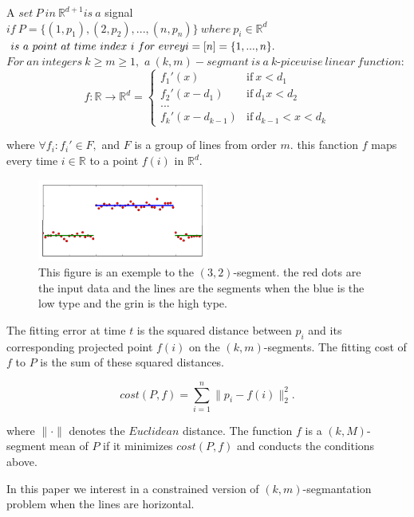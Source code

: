 \documentclass{vldb}
\begin{document}
\begin{definition}
A $set\ P\ in\ \mathbb{R}^{d+1} is\ a$ signal\\ 
$if\ P = \lbrace(1, p_1),(2, p_2),...,(n, p_n)\rbrace\ where\ p_i\in\mathbb{R}^d$ 
$is\ a\ point\ at\ time\ index\ i\ for\ evrey\\
i=[n]=\lbrace1,...,n\rbrace.$
$For\ an\ integers\ k\geq m\geq1,$
$a\ (k,m)-segmant\ is\ a\ k$-$picewise\ linear\ function:$
\[
f:\mathbb{R}\rightarrow\mathbb{R}^d = 
\begin{cases}
  \phantom{}f_1'(x) & \text{if}\ x<d_1 \\
  f_2'(x-d_1)        & \text{if}\ d_1x<d_2\\
  ...\\
  f_k'(x-d_{k-1})    & \text{if}\ d_{k-1}<x<d_k
\end{cases}
\]


where $\forall f_i : f_i' \in F,$ and $F$ is a group of lines from order $m$.
this fanction $f$ maps every time $i\in \mathbb{R}$ to a point $f(i)$ in $\mathbb{R}^d$.
\begin{figure}[H]

    \includegraphics[width=0.5\textwidth]{12.png}
      \caption{This figure is an exemple to the $(3,2)$-segment. the red dots are the input data and the lines are the segments when the blue is the low type and the grin is the high type. 
      }
  \centering
\end{figure}

The fitting error at time $t$ is the squared distance
between $p_i$ and its corresponding projected point $f(i)$ on the $(k,m)$-segments.
The fitting cost of $f$ to $P$ is the sum of these squared distances.

\[
cost(P,f) = \sum_{i=1}^{n}\parallel p_i-f(i)\parallel_{2}^{2}.
\]

where $\parallel\cdot\parallel$ denotes the $Euclidean$ distance. 
The function $f$ is a $(k,M)$-segment mean of $P$ if it minimizes $cost(P,f)$ and conducts the conditions above.
\end{definition}

In this paper we interest in a constrained version of $(k,m)$-segmantation problem when the lines are horizontal.
\end{document}
